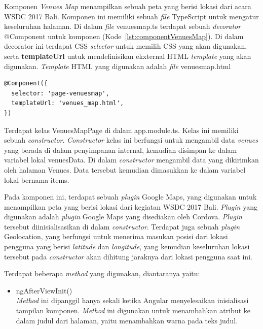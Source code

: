 \begin{enumerate}
\begin{enumerate}
		Komponen \textit{Venues Map} menampilkan sebuah peta yang berisi lokasi dari acara WSDC 2017 Bali. Komponen ini memiliki sebuah \textit{file} TypeScript untuk mengatur keseluruhan halaman. Di dalam \textit{file} venues\textunderscore map.ts terdapat sebuah \textit{decorator} @Component untuk komponen (Kode~\ref{lst:componentVenuesMap}). Di dalam decorator ini terdapat CSS \textit{selector} untuk memilih CSS yang akan digunakan, serta \textbf{templateUrl} untuk mendefinisikan ekxternal HTML \textit{template} yang akan digunakan. \textit{Template} HTML yang digunakan adalah \textit{file} venues\textunderscore map.html
	
\begin{lstlisting}[label={lst:componentVenuesMap}, caption=@Component pada venues\textunderscore map.ts]
@Component({
  selector: 'page-venuesmap',
  templateUrl: 'venues_map.html',
})
\end{lstlisting}	

	Terdapat kelas VenuesMapPage di dalam app.module.ts. Kelas ini memiliki sebuah \textit{constructor}. \textit{Constructor} kelas ini berfungsi untuk mengambil data \textit{venues} yang berada di dalam penyimpanan internal, kemudian disimpan ke dalam variabel lokal venuesData. Di dalam \textit{constructor} mengambil data yang dikirimkan oleh halaman Venues. Data tersebut kemudian dimasukkan ke dalam variabel lokal bernama items. 	

	Pada komponen ini, terdapat sebuah \textit{plugin} Google Maps, yang digunakan untuk menampilkan peta yang berisi lokasi dari kegiatan WSDC 2017 Bali. \textit{Plugin} yang digunakan adalah \textit{plugin} Google Maps yang disediakan oleh Cordova. \textit{Plugin} tersebut diinisialisasikan di dalam \textit{constructor}. Terdapat juga sebuah \textit{plugin} Geolocation, yang berfungsi untuk menerima masukan posisi dari lokasi pengguna yang berisi \textit{latitude} dan \textit{longitude}, yang kemudian keseluruhan lokasi tersebut pada \textit{constructor} akan dihitung jaraknya dari lokasi pengguna saat ini. 
	
	Terdapat beberapa \textit{method} yang digunakan, diantaranya yaitu:
	
	\begin{itemize}
		\item ngAfterViewInit()\\
		\textit{Method} ini dipanggil hanya sekali ketika Angular menyelesaikan inisialisasi tampilan komponen. \textit{Method} ini digunakan untuk menambahkan atribut ke dalam judul dari halaman, yaitu menambahkan warna pada teks judul.
	

\end{itemize}
\end{enumerate}
\end{enumerate}
